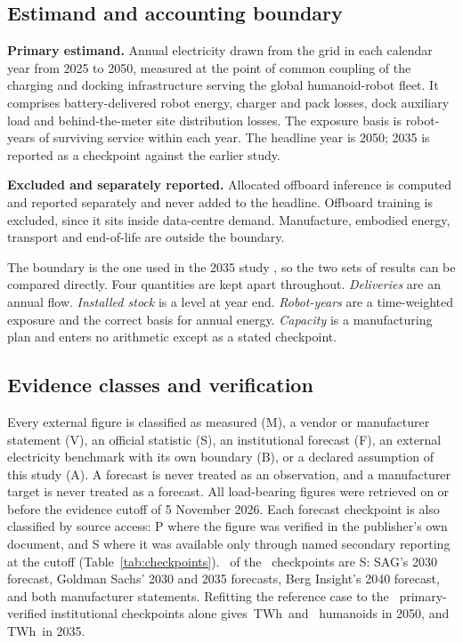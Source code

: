 \documentclass[11pt]{article}
\newcommand{\TWh}{\,TWh}
\newcommand{\tabref}[1]{Table~\ref{#1}}
\begin{document}
\subsection{Estimand and accounting boundary}\label{sec:estimand}
\begin{estbox}
\textbf{Primary estimand.} Annual electricity drawn from the grid in each calendar year from 2025 to 2050, measured at the point of common coupling of the charging and docking infrastructure serving the global humanoid-robot fleet. It comprises battery-delivered robot energy, charger and pack losses, dock auxiliary load and behind-the-meter site distribution losses. The exposure basis is robot-years of surviving service within each year. The headline year is 2050; 2035 is reported as a checkpoint against the earlier study.

\smallskip
\textbf{Excluded and separately reported.} Allocated offboard inference is computed and reported separately and never added to the headline. Offboard training is excluded, since it sits inside data-centre demand. Manufacture, embodied energy, transport and end-of-life are outside the boundary.
\end{estbox}

\noindent The boundary is the one used in the 2035 study \citep{merilehto2026a}, so the two sets of results can be compared directly. Four quantities are kept apart throughout. \emph{Deliveries} are an annual flow. \emph{Installed stock} is a level at year end. \emph{Robot-years} are a time-weighted exposure and the correct basis for annual energy. \emph{Capacity} is a manufacturing plan and enters no arithmetic except as a stated checkpoint.

\subsection{Evidence classes and verification}
Every external figure is classified as measured (M), a vendor or manufacturer statement (V), an official statistic (S), an institutional forecast (F), an external electricity benchmark with its own boundary (B), or a declared assumption of this study (A). A forecast is never treated as an observation, and a manufacturer target is never treated as a forecast. All load-bearing figures were retrieved on or before the evidence cutoff of 5 November 2026. Each forecast checkpoint is also classified by source access: P where the figure was verified in the publisher's own document, and S where it was available only through named secondary reporting at the cutoff (\tabref{tab:checkpoints}). \NSecondary\ of the \NCheckpoints\ checkpoints are S: SAG's 2030 forecast, Goldman Sachs' 2030 and 2035 forecasts, Berg Insight's 2040 forecast, and both manufacturer statements. Refitting the reference case to the \PrimN\ primary-verified institutional checkpoints alone gives \PrimTWh\TWh\ and \PrimStock\ humanoids in 2050, and \PrimTWhThirtyFive\TWh\ in 2035.
\end{document}
